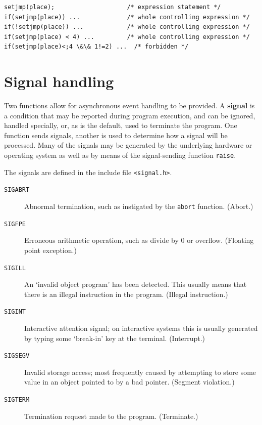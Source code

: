   \begin{Verbatim}
setjmp(place);                    /* expression statement */
if(setjmp(place)) ...             /* whole controlling expression */
if(!setjmp(place)) ...            /* whole controlling expression */
if(setjmp(place) < 4) ...         /* whole controlling expression */
if(setjmp(place)<;4 \&\& 1!=2) ...  /* forbidden */
\end{Verbatim}

 
        \section{Signal handling}
        

  

  Two functions allow for asynchronous event handling to be provided.
   A \textbf{signal} is a condition that may be reported during program
   execution, and can be ignored, handled specially, or, as is the default,
   used to terminate the program.  One function sends signals, another is used
   to determine how a signal will be processed. Many of the signals may be
   generated by the underlying hardware or operating system as well as by means
   of the signal-sending function \texttt{raise}.


  The signals are defined in the include file
   \texttt{<signal.h>}.


  \begin{description}
   \item[\texttt{SIGABRT}] Abnormal termination, such as instigated by the \texttt{abort}
    function. (Abort.)

   \item[\texttt{SIGFPE}] Erroneous arithmetic operation, such as divide by 0 or
    overflow. (Floating point exception.)

   \item[\texttt{SIGILL}] An `invalid object program' has been detected. This
    usually means that there is an illegal instruction in the
    program.  (Illegal instruction.)

   \item[\texttt{SIGINT}] Interactive attention signal; on interactive systems this
    is usually generated by typing some `break-in' key at the
    terminal. (Interrupt.)

   \item[\texttt{SIGSEGV}] Invalid storage access; most frequently caused by
    attempting to store some value in an object pointed to by
    a bad pointer.  (Segment violation.)

   \item[\texttt{SIGTERM}] Termination request made to the program. (Terminate.)
  \end{description}

